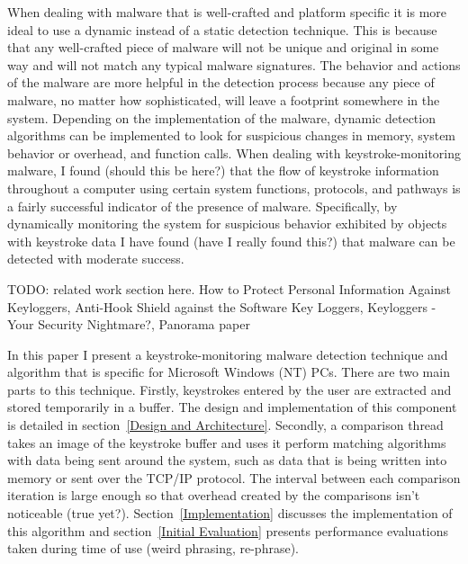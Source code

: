 \documentclass[times, 10pt,twocolumn]{article}
\begin{document}
When dealing with malware that is well-crafted and platform specific it is more ideal to use a dynamic instead of a static detection technique. This is because that any well-crafted piece of malware will not be unique and original in some way and will not match any typical malware signatures. The behavior and actions of the malware are more helpful in the detection process because any piece of malware, no matter how sophisticated, will leave a footprint somewhere in the system. Depending on the implementation of the malware, dynamic detection algorithms can be implemented to look for suspicious changes in memory, system behavior or overhead, and function calls. When dealing with keystroke-monitoring malware, I found (should this be here?) that the flow of keystroke information throughout a computer using certain system functions, protocols, and pathways is a fairly successful indicator of the presence of malware. Specifically, by dynamically monitoring the system for suspicious behavior exhibited by objects with keystroke data I have found (have I really found this?) that malware can be detected with moderate success.

TODO: related work section here. How to Protect Personal Information Against Keyloggers, Anti-Hook Shield against the Software Key Loggers, Keyloggers - Your Security Nightmare?, Panorama paper

In this paper I present a keystroke-monitoring malware detection technique and algorithm that is specific for Microsoft Windows (NT) PCs. There are two main parts to this technique. Firstly, keystrokes entered by the user are extracted and stored temporarily in a buffer. The design and implementation of this component is detailed in section~\ref{Design and Architecture}. Secondly, a comparison thread takes an image of the keystroke buffer and uses it perform matching algorithms with data being sent around the system, such as data that is being written into memory or sent over the TCP/IP protocol. The interval between each comparison iteration is large enough so that overhead created by the comparisons isn't noticeable (true yet?). Section~\ref{Implementation} discusses the implementation of this algorithm and section~\ref{Initial Evaluation} presents performance evaluations taken during time of use (weird phrasing, re-phrase).
\end{document}
